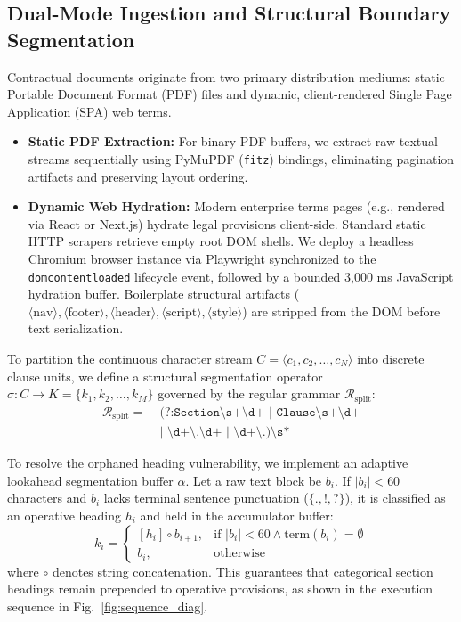 \documentclass[conference]{IEEEtran}
\begin{document}
\subsection{Dual-Mode Ingestion and Structural Boundary Segmentation}
Contractual documents originate from two primary distribution mediums: static Portable Document Format (PDF) files and dynamic, client-rendered Single Page Application (SPA) web terms. 
\begin{itemize}
    \item \textbf{Static PDF Extraction:} For binary PDF buffers, we extract raw textual streams sequentially using PyMuPDF (\texttt{fitz}) bindings, eliminating pagination artifacts and preserving layout ordering.
    \item \textbf{Dynamic Web Hydration:} Modern enterprise terms pages (e.g., rendered via React or Next.js) hydrate legal provisions client-side. Standard static HTTP scrapers retrieve empty root DOM shells. We deploy a headless Chromium browser instance via Playwright synchronized to the \texttt{domcontentloaded} lifecycle event, followed by a bounded 3,000 ms JavaScript hydration buffer. Boilerplate structural artifacts ($\langle\text{nav}\rangle, \langle\text{footer}\rangle, \langle\text{header}\rangle, \langle\text{script}\rangle, \langle\text{style}\rangle$) are stripped from the DOM before text serialization.
\end{itemize}

To partition the continuous character stream $C = \langle c_1, c_2, \dots, c_N \rangle$ into discrete clause units, we define a structural segmentation operator $\sigma: C \to K = \{k_1, k_2, \dots, k_M\}$ governed by the regular grammar $\mathcal{R}_{\text{split}}$:
\begin{align}
\mathcal{R}_{\text{split}} = \;& \texttt{\^{}(?:Section\textbackslash s+\textbackslash d+ | Clause\textbackslash s+\textbackslash d+} \nonumber \\
& \texttt{| \textbackslash d+\textbackslash .\textbackslash d+ | \textbackslash d+\textbackslash .)\textbackslash s*}
\label{eq:regex_split}
\end{align}

To resolve the orphaned heading vulnerability, we implement an adaptive lookahead segmentation buffer $\alpha$. Let a raw text block be $b_i$. If $|b_i| < 60$ characters and $b_i$ lacks terminal sentence punctuation ($\{., !, ?\}$), it is classified as an operative heading $h_i$ and held in the accumulator buffer:
\begin{equation}
k_i = 
\begin{cases} 
[h_i] \circ b_{i+1}, & \text{if } |b_i| < 60 \land \text{term}(b_i) = \emptyset \\
b_i, & \text{otherwise}
\end{cases}
\label{eq:lookahead}
\end{equation}
where $\circ$ denotes string concatenation. This guarantees that categorical section headings remain prepended to operative provisions, as shown in the execution sequence in Fig.~\ref{fig:sequence_diag}.
\end{document}

